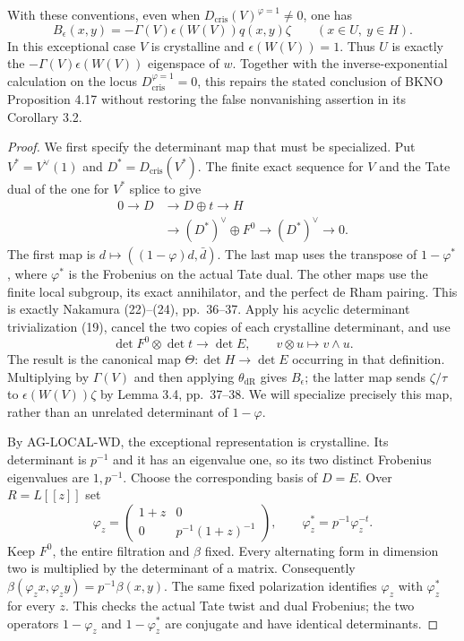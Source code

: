 \begin{proposition}
With these conventions, even when
$D_{\mathrm{cris}}(V)^{\varphi=1}\ne0$, one has
\[
 B_\epsilon(x,y)
   =-\Gamma(V)\epsilon(W(V))q(x,y)\zeta
       \qquad(x\in U,\ y\in H).
\tag{AG-local-splice}
\]
In this exceptional case $V$ is crystalline and
$\epsilon(W(V))=1$.  Thus $U$ is exactly the
$-\Gamma(V)\epsilon(W(V))$ eigenspace of $w$.
Together with the inverse-exponential calculation on
the locus $D_{\mathrm{cris}}^{\varphi=1}=0$, this repairs
the stated conclusion of BKNO Proposition 4.17 without
restoring the false nonvanishing assertion in its
Corollary 3.2.
\end{proposition}
\begin{proof}
We first specify the determinant map that must be
specialized.  Put $V^*=V^\vee(1)$ and
$D^*=D_{\mathrm{cris}}(V^*)$.  The finite exact sequence
for $V$ and the Tate dual of the one for $V^*$ splice
to give
\[
\begin{aligned}
0\longrightarrow D&\longrightarrow D\oplus t
 \longrightarrow H\\
 &\longrightarrow (D^*)^\vee\oplus F^0
 \longrightarrow (D^*)^\vee\longrightarrow0.
\end{aligned}
\tag{AG-local-spliced-complex}
\]
The first map is $d\mapsto((1-\varphi)d,\bar d)$.
The last map uses the transpose of $1-\varphi^*$,
where $\varphi^*$ is the Frobenius on the actual Tate
dual.  The other maps use the finite local subgroup,
its exact annihilator, and the perfect de Rham pairing.
This is exactly Nakamura (22)--(24), pp.~36--37.
Apply his acyclic determinant trivialization (19),
cancel the two copies of each crystalline determinant,
and use
\[
        \det F^0\otimes\det t\longrightarrow\det E,
                  \qquad v\otimes u\longmapsto v\wedge u.
\]
The result is the canonical map
$\Theta:\det H\to\det E$ occurring in that definition.
Multiplying by $\Gamma(V)$ and then applying
$\theta_{\mathrm{dR}}$ gives $B_\epsilon$;
the latter map sends $\zeta/\tau$ to
$\epsilon(W(V))\zeta$ by Lemma 3.4, pp.~37--38.
We will specialize precisely this map, rather than
an unrelated determinant of $1-\varphi$.

By AG-LOCAL-WD, the exceptional representation is
crystalline.  Its determinant is $p^{-1}$ and it has
an eigenvalue one, so its two distinct Frobenius
eigenvalues are $1,p^{-1}$.  Choose the corresponding
basis of $D=E$.  Over $R=L[[z]]$ set
\[
 \varphi_z=
 \begin{pmatrix}1+z&0\\0&p^{-1}(1+z)^{-1}\end{pmatrix},
       \qquad \varphi_z^*=p^{-1}\varphi_z^{-t}.
\tag{AG-local-polarized-deformation}
\]
Keep $F^0$, the entire filtration and $\beta$ fixed.
Every alternating form in dimension two is multiplied
by the determinant of a matrix.  Consequently
$\beta(\varphi_zx,\varphi_zy)=p^{-1}\beta(x,y)$.
The same fixed polarization identifies $\varphi_z$
with $\varphi_z^*$ for every $z$.  This checks the
actual Tate twist and dual Frobenius; the two operators
$1-\varphi_z$ and $1-\varphi_z^*$ are conjugate and
have identical determinants.


\end{proof}
